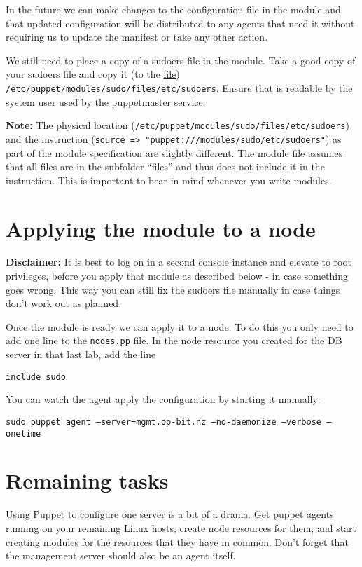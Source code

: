 \documentclass{article}   	%
\begin{document}
In the future we can make changes to the configuration file in the module and that updated configuration will be distributed to any agents that need it without requiring us to update the manifest or take any other action.

We still need to place a copy of a sudoers file in the module.  Take a good copy of your sudoers file and copy it (to the \underline{file}) \texttt{/etc/puppet/modules/sudo/files/etc/sudoers}. Ensure that is readable by the system user used by the puppetmaster service.

\textbf{Note:} The physical location (\texttt{/etc/puppet/modules/sudo/\underline{files}/etc/sudoers}) and the instruction (\texttt{source => "puppet:///modules/sudo/etc/sudoers"}) as part of the module specification are slightly different. The module file assumes that all files are in the subfolder ``files'' and thus does not include it in the instruction. This is important to bear in mind whenever you write modules.

\section*{Applying the module to a node}

\textbf{Disclaimer:} It is best to log on in a second console instance and elevate to root privileges, before you apply that module as described below - in case something goes wrong. This way you can still fix the sudoers file manually in case things don't work out as planned.

Once the module is ready we can apply it to a node.  To do this you only need to add one line to the \texttt{nodes.pp} file.  In the node resource you created for the DB server in that last lab, add the line

\texttt{include sudo}

You can watch the agent apply the configuration by starting it manually:

\texttt{sudo puppet agent --server=mgmt.op-bit.nz --no-daemonize --verbose --onetime}

\section*{Remaining tasks}
Using Puppet to configure one server is a bit of a drama.  Get puppet agents running on your remaining Linux hosts, create node resources for them, and start creating modules for the resources that they have in common.  Don't forget that the management server should also be an agent itself.
\end{document}
